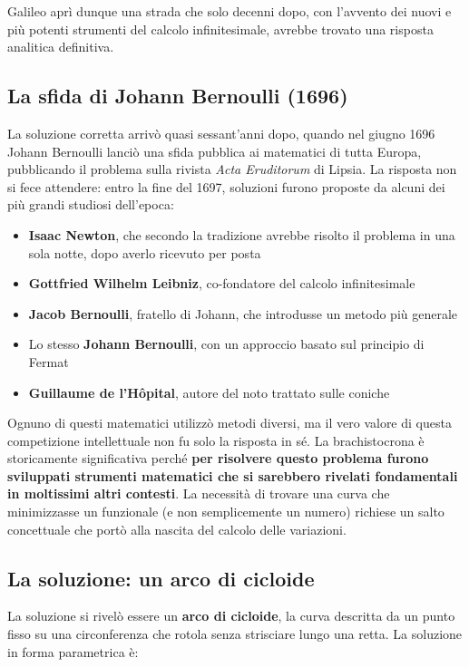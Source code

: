 \documentclass[a4paper,12pt]{article} %
\begin{document}
Galileo aprì dunque una strada che solo decenni dopo, con l'avvento dei nuovi e più potenti strumenti del calcolo infinitesimale, avrebbe trovato una risposta analitica definitiva.

\subsection{La sfida di Johann Bernoulli (1696)}

La soluzione corretta arrivò quasi sessant'anni dopo, quando nel giugno 1696 Johann Bernoulli lanciò una sfida pubblica ai matematici di tutta Europa, pubblicando il problema sulla rivista \textit{Acta Eruditorum} di Lipsia.
La risposta non si fece attendere: entro la fine del 1697, soluzioni furono proposte da alcuni dei più grandi studiosi dell'epoca:

\begin{itemize}
    \item \textbf{Isaac Newton}, che secondo la tradizione avrebbe risolto il problema in una sola notte, dopo averlo ricevuto per posta
    \item \textbf{Gottfried Wilhelm Leibniz}, co-fondatore del calcolo infinitesimale
    \item \textbf{Jacob Bernoulli}, fratello di Johann, che introdusse un metodo più generale
    \item Lo stesso \textbf{Johann Bernoulli}, con un approccio basato sul principio di Fermat
    \item \textbf{Guillaume de l'Hôpital}, autore del noto trattato sulle coniche
\end{itemize}

Ognuno di questi matematici utilizzò metodi diversi, ma il vero valore di questa competizione intellettuale non fu solo la risposta in sé. La brachistocrona è storicamente significativa perché \textbf{per risolvere questo problema furono sviluppati strumenti matematici che si sarebbero rivelati fondamentali in moltissimi altri contesti}. La necessità di trovare una curva che minimizzasse un funzionale (e non semplicemente un numero) richiese un salto concettuale che portò alla nascita del calcolo delle variazioni.

\subsection{La soluzione: un arco di cicloide}

La soluzione si rivelò essere un \textbf{arco di cicloide}, la curva descritta da un punto fisso su una circonferenza che rotola senza strisciare lungo una retta. La soluzione in forma parametrica è:
\end{document}
